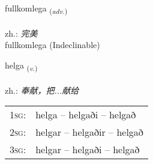 \documentclass[frontgrid, backgrid]{flacards}\usepackage[]{graphicx}\usepackage[]{xcolor}
\begin{document}

\renewcommand{\flhead}{\vskip5pt \fboxsep=0pt {\small\bfseries\footnotesize Atviksorð | 副词}}
\renewcommand{\fcfoot}{\vskip5pt \fboxsep=0pt \hspace{2pt}{\small\bfseries\footnotesize 3K}}

\renewcommand{\blhead}{\vskip5pt {\small\bfseries\footnotesize Atviksorð | 副词 }}
\renewcommand{\bcfoot}{\vskip5pt \hspace{2pt}{\small\bfseries\footnotesize 3K}}


{fullkomlega \small{\textsubscript{(\textit{adv.})}} \\[1ex]
 \\
zh.: \emph{完美} \\  [2ex]
fullkomlega (Indeclinable)}

\renewcommand{\flhead}{\vskip5pt \fboxsep=0pt {\small\bfseries\footnotesize Sagnorð | 动词}}
\renewcommand{\fcfoot}{\vskip5pt \fboxsep=0pt \hspace{2pt}{\small\bfseries\footnotesize 3K}}

\renewcommand{\blhead}{\vskip5pt {\small\bfseries\footnotesize Sagnorð | 动词 }}
\renewcommand{\bcfoot}{\vskip5pt \hspace{2pt}{\small\bfseries\footnotesize 3K}}


{helga \small{\textsubscript{(\textit{v.})}} \\[1ex] %
\textphonetic{[hɛlka]} \\
zh.: \emph{奉献，把...献给} \\  [2ex]
\renewcommand*{\arraystretch}{0.8}
\begin{tabular}{p{1cm}l}
\textsc{1sg}: & helga -- helgaði -- helgað \\ 
\textsc{2sg}: & helgar -- helgaðir -- helgað \\ 
\textsc{3sg}: & helgar -- helgaði -- helgað \\ 
\end{tabular}
}
\end{document}
